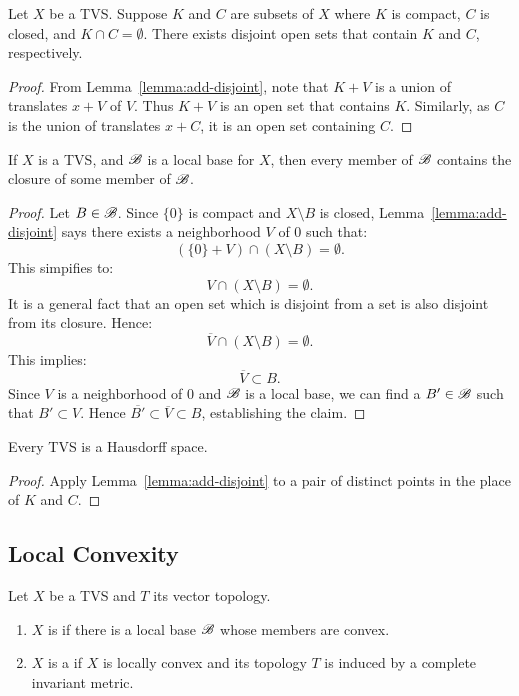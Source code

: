\begin{theorem}
	Let $X$ be a TVS. Suppose $K$ and $C$ are subsets of $X$ where $K$ is compact, $C$ is closed, and $K \cap C = \emptyset$. There exists disjoint open sets that contain $K$ and $C$, respectively.
\end{theorem}
	\begin{proof}
		From Lemma~\ref{lemma:add-disjoint}, note that $K+V$ is a union of translates $x+V$ of $V$. Thus $K+V$ is an open set that contains $K$. Similarly, as $C$ is the union of translates $x + C$, it is an open set containing $C$.
	\end{proof}

\begin{corollary}
	If $X$ is a TVS, and $\mathscr{B}$ is a local base for $X$, then every member of $\mathscr{B}$ contains the closure of some member of $\mathscr{B}$.
\end{corollary}
	\begin{proof}
		Let $B \in \mathscr{B}$. Since $\{0\}$ is compact and $X \setminus B$ is closed, Lemma~\ref{lemma:add-disjoint} says there exists a neighborhood $V$ of $0$ such that:
		\[
			(\{0\} + V) \cap (X \setminus B) = \emptyset.
		\] 
		This simpifies to:
		\[
			V \cap (X \setminus B) = \emptyset.
		\] 
		It is a general fact that an open set which is disjoint from a set is also disjoint from its closure. Hence:
		\[
			\overline{V} \cap (X \setminus B) = \emptyset.
		\] 
		This implies:
		\[
			\overline{V} \subset B.
		\] 
		Since $V$ is a neighborhood of $0$ and $\mathscr{B}$ is a local base, we can find a $B' \in \mathscr{B}$ such that $B' \subset V$. Hence $\overline{B'} \subset \overline{V} \subset B$, establishing the claim.
	\end{proof}

\begin{corollary}
	Every TVS is a Hausdorff space.
\end{corollary}
	\begin{proof}
		Apply Lemma~\ref{lemma:add-disjoint} to a pair of distinct points in the place of $K$ and $C$. 
	\end{proof}

\subsection{Local Convexity}

\begin{definition}
	Let $X$ be a TVS and $T$ its vector topology.
	\mbox{}
	\begin{enumerate}[label = (\alph*),itemsep=1pt,topsep=3pt]
		\item $X$ is  if there is a local base $\mathscr{B}$ whose members are convex.
		\item $X$ is a  if $X$ is locally convex and its topology $T$ is induced by a complete invariant metric.
	\end{enumerate}
\end{definition}

